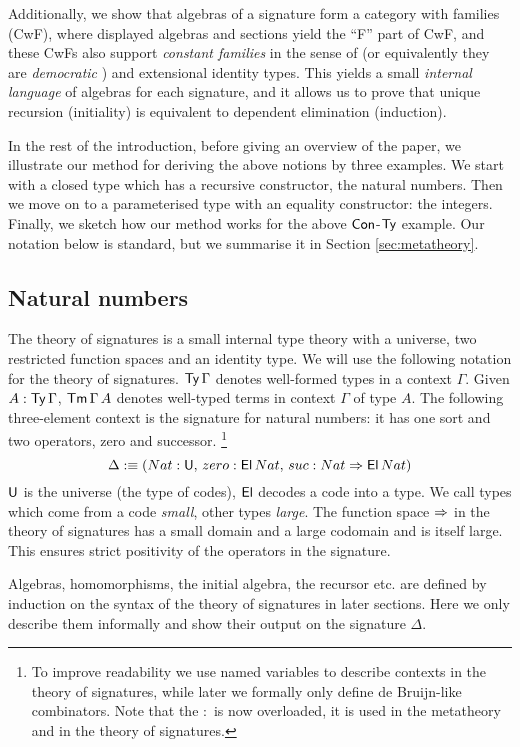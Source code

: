 \documentclass[acmsmall,review]{acmart}\settopmatter{printfolios=true,printccs=false,printacmref=false}
\begin{document}
Additionally, we show that algebras of a signature form a category
with families (CwF), where displayed algebras and sections yield the
``F'' part of CwF, and these CwFs also support \emph{constant
  families} in the sense of \cite[p.~74]{forsberg-phd} (or
equivalently they are \emph{democratic} \cite{clairambault2014biequivalence}) and extensional
identity types. This yields a small \emph{internal language} of
algebras for each signature, and it allows us to prove that unique
recursion (initiality) is equivalent to dependent elimination (induction).

In the rest of the introduction, before giving an overview of the
paper, we illustrate our method for deriving the above notions by
three examples. We start with a closed type which has a recursive
constructor, the natural numbers. Then we move on to a parameterised
type with an equality constructor: the integers. Finally, we sketch
how our method works for the above $\mathsf{Con}$-$\mathsf{Ty}$ example. Our notation
below is standard, but we summarise it in Section
\ref{sec:metatheory}.

\subsection{Natural numbers}
\label{sec:naturals}

The theory of signatures is a small internal type theory with a
universe, two restricted function spaces and an identity type. We will
use the following notation for the theory of signatures. $\mathsf{Ty}\,\Gamma$
denotes well-formed types in a context $\Gamma$. Given
$A:\mathsf{Ty}\,\Gamma$, $\mathsf{Tm}\,\Gamma\,A$ denotes well-typed terms in context
$\Gamma$ of type $A$. The following three-element context is the
signature for natural numbers: it has one sort and two operators, zero
and successor.
\footnote{To improve readability we use named variables to describe
  contexts in the theory of signatures, while later we formally only define
  de Bruijn-like combinators. Note that the $:$ is now overloaded, it
  is used in the metatheory and in the theory of signatures.}
\[
\Delta :\equiv (Nat:\mathsf{U},\,zero:\mathsf{El}\,Nat,\,suc:Nat\Rightarrow \mathsf{El}\,Nat)
\]
$\mathsf{U}$ is the universe (the type of codes), $\mathsf{El}$ decodes a code into a
type. We call types which come from a code {\em small}, other types
{\em large}. The function space $\Rightarrow$ in the theory of signatures
has a small domain and a large codomain and is itself large. This
ensures strict positivity of the operators in the signature.

Algebras, homomorphisms, the initial algebra, the recursor etc. are
defined by induction on the syntax of the theory of signatures in
later sections. Here we only describe them informally and show their
output on the signature $\Delta$.
\end{document}
